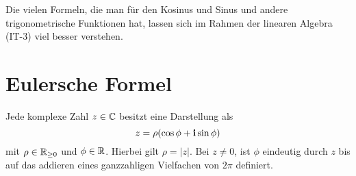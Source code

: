 \begin{bem} 
	Die vielen Formeln, die man für den Kosinus und Sinus und andere trigonometrische Funktionen hat, lassen sich im Rahmen der linearen Algebra (IT-3) viel besser verstehen. 
\end{bem} 

\section{Eulersche Formel} 

\begin{thm} \label{thm:z:betr:arg}
	Jede komplexe Zahl $z \in \mathbb{C}$ besitzt eine Darstellung als 
	\[
		z = \rho ( \cos \phi + \mathbf{i} \sin \phi )
	\]
	mit $\rho \in \mathbb{R}_{\ge 0}$ und $\phi \in \mathbb{R}$. Hierbei gilt $\rho = |z|$. Bei $z \ne 0$, ist $\phi$ eindeutig durch $z$ bis auf das addieren eines ganzzahligen Vielfachen von $2 \pi$ definiert. 
\end{thm}

